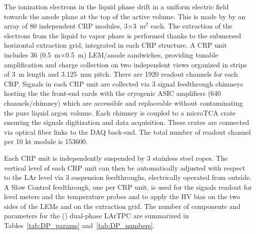 The ionization electrons in the liquid phase drift  in a uniform electric field towards the anode plane at the top of the active
volume. This is made by by an array of 80 independent CRP modules, 3$\times$3~m$^2$ each.
The extraction of the electrons from the liquid to vapor phase is performed thanks to the submersed horizontal extraction grid, 
integrated in each CRP structure. A CRP unit includes 36 (0.5~m$\times$0.5~m) LEM/anode sandwiches, providing tunable
amplification and charge collection on two independent views organized in strips of 3~m length and 3.125~mm pitch. There are
1920 readout channels for each CRP. Signals in each CRP unit are collected via 3 signal feedthrough chimneys hosting the
the front-end cards with the cryogenic ASIC amplifiers (640 channels/chimney) which are accessible and replaceable without
contaminating the pure liquid argon volume. Each chimney is coupled to a microTCA crate ensuring the signals digitization and 
data acquisition. These crates are connected  via optical fiber links to the DAQ back-end. The total number of readout channel 
per 10 kt module is 153600.
 
Each CRP unit is independently suspended by 3 stainless steel ropes. The vertical level of each CRP unit can then be automatically
adjusted with respect to the LAr level via 3 suspension feedthroughs, electrically operated from outside. A Slow Control feedthrough, 
one per CRP unit, is used for the signals readout for level meters and the temperature probes and to apply the HV bias on the two
sides of the LEMs and on the extraction grid. The number of components and parameters for the  ()
dual-phase LArTPC are summarized in Tables~\ref{tab:DP_params}
and~\ref{tab:DP_numbers}.

